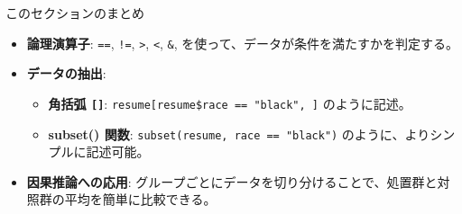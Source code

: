 \documentclass[
  ignorenonframetext,
]{beamer}
\providecommand{\tightlist}{%
  \setlength{\itemsep}{0pt}\setlength{\parskip}{0pt}}
\begin{document}
\begin{frame}[fragile]{このセクションのまとめ}
\protect\hypertarget{ux3053ux306eux30bbux30afux30b7ux30e7ux30f3ux306eux307eux3068ux3081}{}
\begin{itemize}
\tightlist
\item
  \textbf{論理演算子}: \texttt{==}, \texttt{!=},
  \texttt{\textgreater{}}, \texttt{\textless{}}, \texttt{\&},
  \texttt{\textbar{}} を使って、データが条件を満たすかを判定する。
\item
  \textbf{データの抽出}:

  \begin{itemize}
  \tightlist
  \item
    \textbf{角括弧 \texttt{{[}{]}}}:
    \texttt{resume{[}resume\$race\ ==\ "black",\ {]}} のように記述。
  \item
    \textbf{subset() 関数}: \texttt{subset(resume,\ race\ ==\ "black")}
    のように、よりシンプルに記述可能。
  \end{itemize}
\item
  \textbf{因果推論への応用}:
  グループごとにデータを切り分けることで、処置群と対照群の平均を簡単に比較できる。
\end{itemize}
\end{frame}
\end{document}

